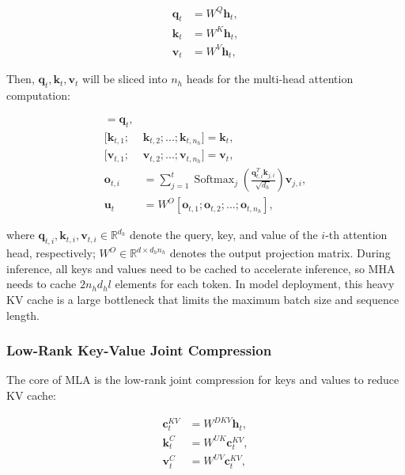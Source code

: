\begin{align}
    \mathbf{q}_{t} &= W^{Q} \mathbf{h}_{t}, \\
    \mathbf{k}_{t} &= W^{K} \mathbf{h}_{t}, \\
    \mathbf{v}_{t} &= W^{V} \mathbf{h}_{t},
\end{align}

Then, $\mathbf{q}_{t}, \mathbf{k}_{t}, \mathbf{v}_{t}$ will be sliced into $n_h$ heads for the multi-head attention computation:

\begin{align}
    [\mathbf{q}_{t, 1};&\mathbf{q}_{t, 2};...;\mathbf{q}_{t, n_{h}}] = \mathbf{q}_{t}, \\
    [\mathbf{k}_{t, 1};&\mathbf{k}_{t, 2};...;\mathbf{k}_{t, n_{h}}] = \mathbf{k}_{t}, \\
    [\mathbf{v}_{t, 1};&\mathbf{v}_{t, 2};...;\mathbf{v}_{t, n_{h}}] = \mathbf{v}_{t}, \\
    \mathbf{o}_{t, i} &= \sum_{j=1}^{t} \operatorname{Softmax}_j(\frac{\mathbf{q}_{t, i}^T \mathbf{k}_{j, i}}{\sqrt{d_{h}}}) \mathbf{v}_{j, i}, \\ 
    \mathbf{u}_{t} &= W^{O} [\mathbf{o}_{t, 1};\mathbf{o}_{t, 2};...;\mathbf{o}_{t, n_{h}}],
\end{align}

where $\mathbf{q}_{t, i}, \mathbf{k}_{t, i}, \mathbf{v}_{t, i} \in \mathbb{R}^{d_h}$ denote the query, key, and value of the $i$-th attention head, respectively; $W^{O} \in \mathbb{R}^{d \times d_h n_h}$ denotes the output projection matrix. During inference, all keys and values need to be cached to accelerate inference, so MHA needs to cache $2 n_{h} d_{h} l$ elements for each token. In model deployment, this heavy KV cache is a large bottleneck that limits the maximum batch size and sequence length. 

\subsubsection{Low-Rank Key-Value Joint Compression}

The core of MLA is the low-rank joint compression for keys and values to reduce KV cache:

\begin{align}
    \mathbf{c}_{t}^{KV} &= W^{DKV} \mathbf{h}_{t}, \\
    \label{eq:c_to_k}
    \mathbf{k}_{t}^{C} &= W^{UK} \mathbf{c}_{t}^{KV}, \\
    \mathbf{v}_{t}^{C} &= W^{UV} \mathbf{c}_{t}^{KV},
\end{align}

